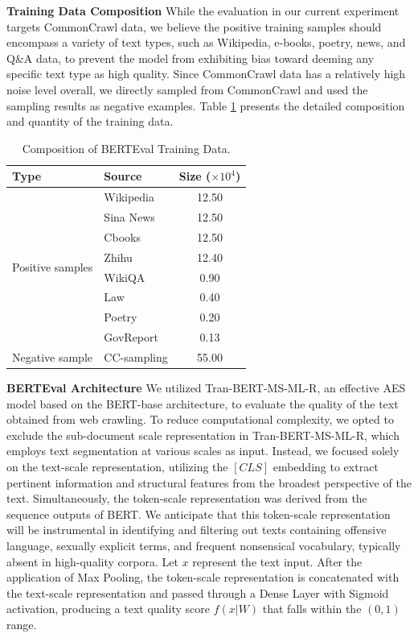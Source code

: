 \documentclass{article}
\newcommand\xrowht[2][0]{\addstackgap[.5\dimexpr#2\relax]{\vphantom{#1}}}
\begin{document}
\textbf{Training Data Composition} While the evaluation in our current experiment targets CommonCrawl data, we believe the positive training samples should encompass a variety of text types, such as Wikipedia, e-books, poetry, news, and Q\&A data, to prevent the model from exhibiting bias toward deeming any specific text type as high quality. Since CommonCrawl data has a relatively high noise level overall, we directly sampled from CommonCrawl and used the sampling results as negative examples. Table \ref{bert_data} presents the detailed composition and quantity of the training data.
\begin{table}[htbp]
	\caption{Composition of BERTEval Training Data.}\label{bert_data}
	\centering
	\begin{tabular}{llc}
		\toprule
		Type     & Source     & Size ($\times 10^4 $) \\
		\midrule
		\multirow{8}{*}{Positive samples}   & Wikipedia & 12.50 \\ 
                                            & Sina News & 12.50 \\
                                    		& Cbooks & 12.50  \\
	                                        & Zhihu & 12.40 \\
	                                        & WikiQA & 0.90 \\
	                                        & Law & 0.40 \\
	                                        & Poetry & 0.20 \\
	                                        & GovReport & 0.13 \\
	    \midrule
            \xrowht[()]{10pt}
		Negative sample & CC-sampling & 55.00 \\
		\bottomrule
	\end{tabular}
\end{table}


\textbf{BERTEval Architecture} We utilized Tran-BERT-MS-ML-R\cite{wang_use_2022}, an effective AES model based on the BERT-base architecture, to evaluate the quality of the text obtained from web crawling. To reduce computational complexity, we opted to exclude the sub-document scale representation in Tran-BERT-MS-ML-R, which employs text segmentation at various scales as input. Instead, we focused solely on the text-scale representation, utilizing the $[CLS]$ embedding to extract pertinent information and structural features from the broadest perspective of the text. Simultaneously, the token-scale representation was derived from the sequence outputs of BERT. We anticipate that this token-scale representation will be instrumental in identifying and filtering out texts containing offensive language, sexually explicit terms, and frequent nonsensical vocabulary, typically absent in high-quality corpora. Let $x$ represent the text input. After the application of Max Pooling, the token-scale representation is concatenated with the text-scale representation and passed through a Dense Layer with Sigmoid activation, producing a text quality score $f(x|W)$ that falls within the $(0, 1)$ range.
\end{document}
